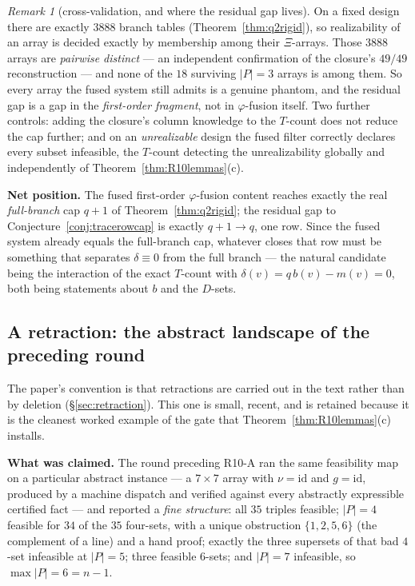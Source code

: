 \documentclass[11pt]{article}
\theoremstyle{plain}
\theoremstyle{definition}
\theoremstyle{remark}
\newtheorem*{remark*}{Remark}
\numberwithin{equation}{section}
\begin{document}
\begin{remark*}[cross-validation, and where the residual gap lives]
On a fixed design there are exactly $3888$ branch tables
(Theorem~\ref{thm:q2rigid}), so realizability of an array is decided exactly by
membership among their $\Xi$-arrays. Those $3888$ arrays are \emph{pairwise
distinct} --- an independent confirmation of the closure's $49/49$ reconstruction
--- and none of the $18$ surviving $|P| = 3$ arrays is among them. So every array
the fused system still admits is a genuine phantom, and the residual gap is a gap
in the \emph{first-order fragment}, not in $\varphi$-fusion itself. Two further
controls: adding the closure's column knowledge to the $T$-count does not reduce
the cap further; and on an \emph{unrealizable} design the fused filter correctly
declares every subset infeasible, the $T$-count detecting the unrealizability
globally and independently of Theorem~\ref{thm:R10lemmas}(c).

\textbf{Net position.} The fused first-order $\varphi$-fusion content reaches
exactly the real \emph{full-branch} cap $q+1$ of Theorem~\ref{thm:q2rigid}; the
residual gap to Conjecture~\ref{conj:tracerowcap} is exactly $q+1\to q$, one row.
Since the fused system already equals the full-branch cap, whatever closes that
row must be something that separates $\delta\equiv0$ from the full branch --- the
natural candidate being the interaction of the exact $T$-count with
$\delta(v) = q\,b(v)-m(v) = 0$, both being statements about $b$ and the $D$-sets.
\end{remark*}

\subsection{A retraction: the abstract landscape of the preceding
round}\label{sec:R9Kretraction}

The paper's convention is that retractions are carried out in the text rather than
by deletion (\S\ref{sec:retraction}). This one is small, recent, and is retained
because it is the cleanest worked example of the gate that
Theorem~\ref{thm:R10lemmas}(c) installs.

\textbf{What was claimed.} The round preceding R10-A ran the same feasibility map
on a particular abstract instance --- a $7\times7$ array with
$\nu = \mathrm{id}$ and $g = \mathrm{id}$, produced by a machine dispatch and
verified against every abstractly expressible certified fact --- and reported a
\emph{fine structure}: all $35$ triples feasible; $|P| = 4$ feasible for $34$ of
the $35$ four-sets, with a unique obstruction $\{1,2,5,6\}$ (the complement of a
line) and a hand proof; exactly the three supersets of that bad $4$-set infeasible
at $|P| = 5$; three feasible $6$-sets; and $|P| = 7$ infeasible, so
$\max|P| = 6 = n-1$.
\end{document}

